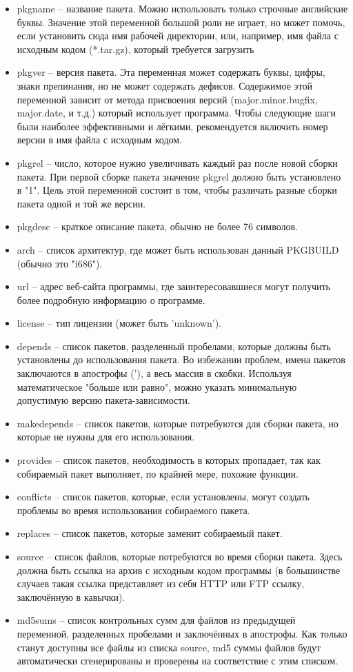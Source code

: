 \begin{itemize}
\item pkgname -- название пакета. Можно использовать только строчные английские буквы. Значение этой переменной большой роли не играет, но может помочь, если установить сюда имя рабочей директории, или, например, имя файла с исходным кодом (*.tar.gz), который требуется загрузить
\item pkgver -- версия пакета. Эта переменная может содержать буквы, цифры, знаки препинания, но не может содержать дефисов. Содержимое этой переменной зависит от метода присвоения версий (major.minor.bugfix, major.date, и т.д.) который использует программа. Чтобы следующие шаги были наиболее эффективными и лёгкими, рекомендуется включить номер версии в имя файла с исходным кодом. 
\item pkgrel -- число, которое нужно увеличивать каждый раз после новой сборки пакета. При первой сборке пакета значение pkgrel должно быть установлено в "1". Цель этой переменной состоит в том, чтобы различать разные сборки пакета одной и той же версии.
\item pkgdesc -- краткое описание пакета, обычно не более 76 символов.
\item arch -- список архитектур, где может быть использован данный PKGBUILD (обычно это "i686"). 
\item url -- адрес веб-сайта программы, где заинтересовавшиеся могут получить более подробную информацию о программе.
\item license -- тип лицензии (может быть 'unknown').
\item depends -- список пакетов, разделенный пробелами, которые должны быть установлены до использования пакета. Во избежании проблем, имена пакетов заключаются в апострофы ('), а весь массив в скобки. Используя математическое "больше или равно", можно указать минимальную допустимую версию пакета-зависимости.
\item makedepends -- список пакетов, которые потребуются для сборки пакета, но которые не нужны для его использования.
\item provides -- список пакетов, необходимость в которых пропадает, так как собираемый пакет выполняет, по крайней мере, похожие функции.
\item conflicts -- список пакетов, которые, если установлены, могут создать проблемы во время использования собираемого пакета.
\item replaces -- список пакетов, которые заменит собираемый пакет.
\item source -- список файлов, которые потребуются во время сборки пакета. Здесь должна быть ссылка на архив с исходным кодом программы (в большинстве случаев такая ссылка представляет из себя HTTP или FTP ссылку, заключённую в кавычки).
\item md5sums -- список контрольных сумм для файлов из предыдущей переменной, разделенных пробелами и заключённых в апострофы. Как только станут доступны все файлы из списка source, md5 суммы файлов будут автоматически сгенерированы и проверены на соответствие с этим списком.
\end{itemize}